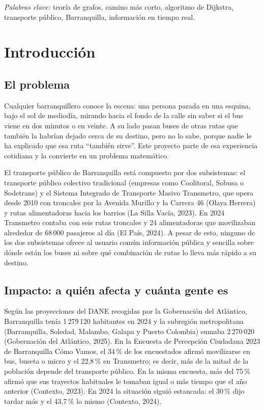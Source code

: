 \documentclass[12pt,letterpaper]{article}
\begin{document}
\noindent\textit{Palabras clave:} teoría de grafos, camino más corto, algoritmo de Dijkstra, transporte público, Barranquilla, información en tiempo real.

\section{Introducción}

\subsection{El problema}
Cualquier barranquillero conoce la escena: una persona parada en una esquina, bajo el sol de mediodía, mirando hacia el fondo de la calle sin saber si el bus viene en dos minutos o en veinte. A su lado pasan buses de otras rutas que también la habrían dejado cerca de su destino, pero no lo sabe, porque nadie le ha explicado que esa ruta ``también sirve''. Este proyecto parte de esa experiencia cotidiana y la convierte en un problema matemático.

El transporte público de Barranquilla está compuesto por dos subsistemas: el transporte público colectivo tradicional (empresas como Coolitoral, Sobusa o Sodetrans) y el Sistema Integrado de Transporte Masivo Transmetro, que opera desde 2010 con troncales por la Avenida Murillo y la Carrera 46 (Olaya Herrera) y rutas alimentadoras hacia los barrios (La Silla Vacía, 2023). En 2024 Transmetro contaba con seis rutas troncales y 24 alimentadoras que movilizaban alrededor de 68\,000 pasajeros al día (El País, 2024). A pesar de esto, ninguno de los dos subsistemas ofrece al usuario común información pública y sencilla sobre dónde están los buses ni sobre qué combinación de rutas lo lleva más rápido a su destino.

\subsection{Impacto: a quién afecta y cuánta gente es}
Según las proyecciones del DANE recogidas por la Gobernación del Atlántico, Barranquilla tenía 1\,279\,120 habitantes en 2024 y la subregión metropolitana (Barranquilla, Soledad, Malambo, Galapa y Puerto Colombia) sumaba 2\,270\,020 (Gobernación del Atlántico, 2025). En la Encuesta de Percepción Ciudadana 2023 de Barranquilla Cómo Vamos, el 34\,\% de los encuestados afirmó movilizarse en bus, buseta o micro y el 22,8\,\% en Transmetro; es decir, más de la mitad de la población depende del transporte público. En la misma encuesta, más del 75\,\% afirmó que sus trayectos habituales le tomaban igual o más tiempo que el año anterior (Contexto, 2023). En 2024 la situación siguió estancada: el 30\,\% dijo tardar más y el 43,7\,\% lo mismo (Contexto, 2024).
\end{document}

